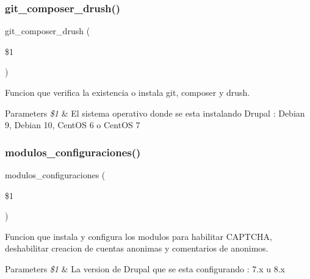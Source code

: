\subsubsection{\texorpdfstring{git\+\_\+composer\+\_\+drush()}{git\_composer\_drush()}}
{\footnotesize\ttfamily git\+\_\+composer\+\_\+drush (\begin{DoxyParamCaption}\item[{}]{\$1 }\end{DoxyParamCaption})}



Funcion que verifica la existencia o instala git, composer y drush. 


\begin{DoxyParams}{Parameters}
{\em \$1} & El sistema operativo donde se esta instalando Drupal \+: \textquotesingle{}Debian 9\textquotesingle{}, \textquotesingle{}Debian 10\textquotesingle{}, \textquotesingle{}Cent\+OS 6\textquotesingle{} o \textquotesingle{}Cent\+OS 7\textquotesingle{} \\
\hline
\end{DoxyParams}
\mbox{\label{Drupal__Instalador__General_8sh_ae5ce76ad68690ff00cb63811e18c8a37}} 
\subsubsection{\texorpdfstring{modulos\+\_\+configuraciones()}{modulos\_configuraciones()}}
{\footnotesize\ttfamily modulos\+\_\+configuraciones (\begin{DoxyParamCaption}\item[{}]{\$1 }\end{DoxyParamCaption})}



Funcion que instala y configura los modulos para habilitar C\+A\+P\+T\+C\+HA, deshabilitar creacion de cuentas anonimas y comentarios de anonimos. 


\begin{DoxyParams}{Parameters}
{\em \$1} & La version de Drupal que se esta configurando \+: \textquotesingle{}7.\+x\textquotesingle{} u \textquotesingle{}8.\+x\textquotesingle{} \\
\hline
\end{DoxyParams}
